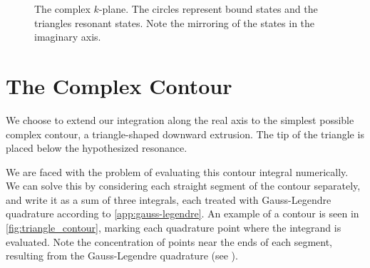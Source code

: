 \documentclass[../main/report.tex]{subfiles}
\begin{document}
\begin{figure}
  \caption{The complex $k$-plane. The circles represent 
  bound states and the triangles resonant states. Note the 
  mirroring of the states in the imaginary axis.}
  \label{fig:complex plane}
\end{figure}

\section{The Complex Contour}
We choose to extend our integration along the real axis to 
the simplest possible complex contour, a triangle-shaped downward extrusion. 
The tip of the triangle is placed below the hypothesized resonance.

We are faced with the problem of evaluating this contour integral numerically. 
We can solve this by considering each straight segment of the contour separately,
and write it as a sum of three integrals, each treated with Gauss-Legendre quadrature according to \cref{app:gauss-legendre}.
An example of a contour is seen in \cref{fig:triangle_contour}, marking each quadrature point where the integrand is evaluated. Note the concentration of points near the ends of each segment, resulting from the Gauss-Legendre quadrature (see \cite{gausslegendre}).
\end{document}
